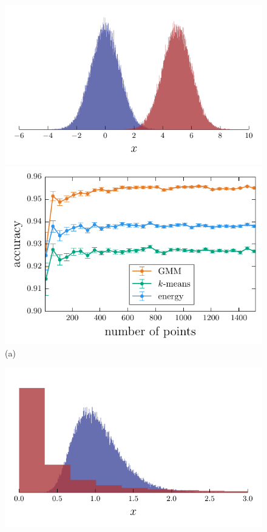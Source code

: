 \documentclass[aps,preprint,nofootinbib,floatfix]{revtex4-1}
\begin{document}
\begin{figure}
\begin{minipage}{0.49\textwidth}
\hspace{1cm}\includegraphics[width=.6\textwidth]{hist_normal.pdf}\\[-.5em]
\includegraphics[width=\textwidth]{gauss1d.pdf}\\[-1em]
(a)
\end{minipage}
\begin{minipage}{0.49\textwidth}
\hspace{1cm}\includegraphics[width=.6\textwidth]{hist_lognormal.pdf}\\[-.5em]

\end{minipage}
\end{figure}
\end{document}
